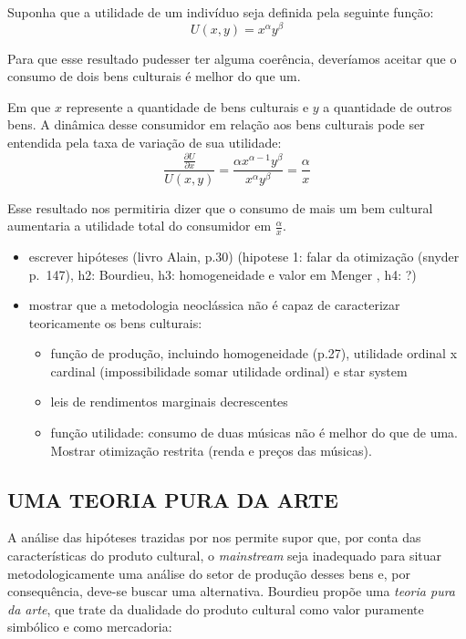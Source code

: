 \documentclass[
]{article}
\providecommand{\tightlist}{%
  \setlength{\itemsep}{0pt}\setlength{\parskip}{0pt}}
\begin{document}
Suponha que a utilidade de um indivíduo seja definida pela seguinte
função: \[U(x,y)=x^\alpha y^\beta\]

Para que esse resultado pudesser ter alguma coerência, deveríamos
aceitar que o consumo de dois bens culturais é melhor do que um.

Em que \(x\) represente a quantidade de bens culturais e \(y\) a
quantidade de outros bens. A dinâmica desse consumidor em relação aos
bens culturais pode ser entendida pela taxa de variação de sua
utilidade:
\[\frac{\frac{\partial U}{\partial x}}{U(x,y)} = \frac{\alpha x^{\alpha-1}y^\beta}{x^\alpha y^\beta} = \frac{\alpha}{x}\]

Esse resultado nos permitiria dizer que o consumo de mais um bem
cultural aumentaria a utilidade total do consumidor em
\(\frac{\alpha}{x}\).

\begin{itemize}
\tightlist
\item
  escrever hipóteses (livro Alain, p.30) (hipotese 1: falar da
  otimização (snyder p.~147), h2: Bourdieu, h3: homogeneidade e valor em
  Menger , h4: ?)
\item
  mostrar que a metodologia neoclássica não é capaz de caracterizar
  teoricamente os bens culturais:

  \begin{itemize}
  \tightlist
  \item
    função de produção, incluindo homogeneidade (p.27), utilidade
    ordinal x cardinal (impossibilidade somar utilidade ordinal) e star
    system
  \item
    leis de rendimentos marginais decrescentes
  \item
    função utilidade: consumo de duas músicas não é melhor do que de
    uma. Mostrar otimização restrita (renda e preços das músicas).
  \end{itemize}
\end{itemize}

\hypertarget{uma-teoria-pura-da-arte}{%
\subsection{UMA TEORIA PURA DA ARTE}\label{uma-teoria-pura-da-arte}}

A análise das hipóteses trazidas por \citet{herscovici} nos permite
supor que, por conta das características do produto cultural, o
\emph{mainstream} seja inadequado para situar metodologicamente uma
análise do setor de produção desses bens e, por consequência, deve-se
buscar uma alternativa. Bourdieu propõe uma \emph{teoria pura da arte},
que trate da dualidade do produto cultural como valor puramente
simbólico e como mercadoria:
\end{document}

